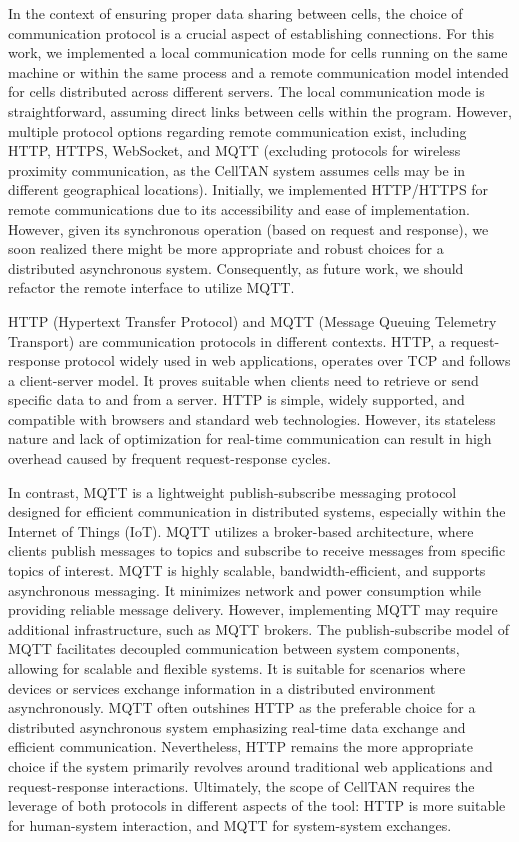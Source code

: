 In the context of ensuring proper data sharing between cells, the choice of communication protocol is a crucial aspect of establishing connections. For this work, we implemented a local communication mode for cells running on the same machine or within the same process and a remote communication model intended for cells distributed across different servers. The local communication mode is straightforward, assuming direct links between cells within the program. However, multiple protocol options regarding remote communication exist, including HTTP, HTTPS, WebSocket, and MQTT (excluding protocols for wireless proximity communication, as the CellTAN system assumes cells may be in different geographical locations). Initially, we implemented HTTP/HTTPS for remote communications due to its accessibility and ease of implementation. However, given its synchronous operation (based on request and response), we soon realized there might be more appropriate and robust choices for a distributed asynchronous system. Consequently, as future work, we should refactor the remote interface to utilize MQTT.

HTTP (Hypertext Transfer Protocol) and MQTT (Message Queuing Telemetry Transport) are communication protocols in different contexts. HTTP, a request-response protocol widely used in web applications, operates over TCP and follows a client-server model. It proves suitable when clients need to retrieve or send specific data to and from a server. HTTP is simple, widely supported, and compatible with browsers and standard web technologies. However, its stateless nature and lack of optimization for real-time communication can result in high overhead caused by frequent request-response cycles.


In contrast, MQTT is a lightweight publish-subscribe messaging protocol designed for efficient communication in distributed systems, especially within the Internet of Things (IoT). MQTT utilizes a broker-based architecture, where clients publish messages to topics and subscribe to receive messages from specific topics of interest. MQTT is highly scalable, bandwidth-efficient, and supports asynchronous messaging. It minimizes network and power consumption while providing reliable message delivery. However, implementing MQTT may require additional infrastructure, such as MQTT brokers.
The publish-subscribe model of MQTT facilitates decoupled communication between system components, allowing for scalable and flexible systems. It is suitable for scenarios where devices or services exchange information in a distributed environment asynchronously. MQTT often outshines HTTP as the preferable choice for a distributed asynchronous system emphasizing real-time data exchange and efficient communication. Nevertheless, HTTP remains the more appropriate choice if the system primarily revolves around traditional web applications and request-response interactions. Ultimately, the scope of CellTAN requires the leverage of both protocols in different aspects of the tool: HTTP is more suitable for human-system interaction, and MQTT for system-system exchanges.


